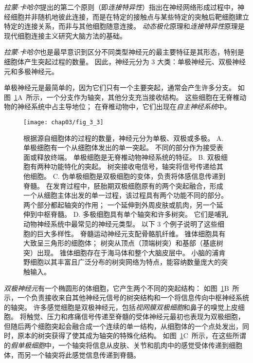 \textit{拉蒙$\cdot$卡哈尔}提出的第二个原则（即\textit{连接特异性}）指出在神经网络形成过程中，神经细胞并非随机地彼此连接，而是在特定的接触点与某些特定的突触后靶细胞建立特定的连接关系，而非与其他细胞随意连接。
\textit{动态极化}原理和\textit{连接特异性}原理是现代细胞连接主义研究大脑方法的基础。


\textit{拉蒙$\cdot$卡哈尔}也是最早意识到区分不同类型神经元的最主要特征是其形态，特别是细胞体产生突起过程的数量。 
因此，神经元分为 3 大类：单极神经元、双极神经元和多极神经元。


单极神经元是最简单的，因为它们只有一个主要突起，通常会产生许多分支。
如图~\ref{fig:3_3}A~所示，一个分支作为轴突，其他分支充当接收结构。
这些细胞在无脊椎动物的神经系统中占主导地位；
在脊椎动物中，它们出现在\textit{自主神经系统}中。


\begin{figure}[htbp]
	\centering
	\texttt{[image: chap03/fig\_3\_3]}
	\caption{根据源自细胞体的过程的数量，神经元分为单极、双极或多极。 
		A. 单极细胞有一个从细胞体发出的单一突起。
		不同的部分作为接受表面或释放终端。
		单极细胞是无脊椎动物神经系统的特征。 
		B. 双极细胞有两种功能特化的突起。
		树突接收电信号，轴突将信号传递给其他细胞。
		C. 伪单极细胞是双极细胞的变体，负责将体感信息传递到脊髓。
		在发育过程中，胚胎期双极细胞原有的两个突起融合，形成一个从细胞主体出发的单一过程，该过程具有两个功能不同的部分。 
		两个部分都起轴突的作用；
		一个延伸到外周皮肤或肌肉，另一个延伸到中枢脊髓\cite{ross2006histology}。
		D. 多极细胞具有单个轴突和许多树突。 
		它们是哺乳动物神经系统中最常见的神经元类型。 
		以下 3 个例子说明了这些细胞的巨大多样性。
		脊髓运动神经元支配骨骼肌纤维。
		锥体细胞具有大致呈三角形的细胞体；
		树突从顶点（顶端树突）和基部（基底树突）出现。 
		锥体细胞存在于海马体和整个大脑皮层中。 
	小脑的浦肯野细胞以其丰富且广泛分布的树突网络为特点，能容纳数量庞大的突触输入\cite{ross2006histology}。}
	\label{fig:3_3}
\end{figure}


\textit{双极神经元}有一个椭圆形的体细胞，它产生两个不同的突起结构：
如图~\ref{fig:3_3}B~所示，一个负责接收来自其他神经元信号的树突结构和一个将信息传向中枢神经系统的轴突。
许多感觉细胞是双极神经元，包括\textit{视网膜双极细胞}和鼻子的嗅觉上皮细胞。
将触觉、压力和疼痛信号传递至脊髓的受体神经元最初也表现为双极细胞，但随后两个细胞突起会融合成一个连续的单一结构，从细胞体的一个点处发出，同时，原本的树突获得了使其成为轴突的特殊化结构。 
如图~\ref{fig:3_3}C~所示，在这些所谓的\textit{假单极细胞}中，一个轴突将信息从皮肤、关节和肌肉中的感觉受体传递到细胞体，而另一个轴突将此感觉信息传递到脊髓。


